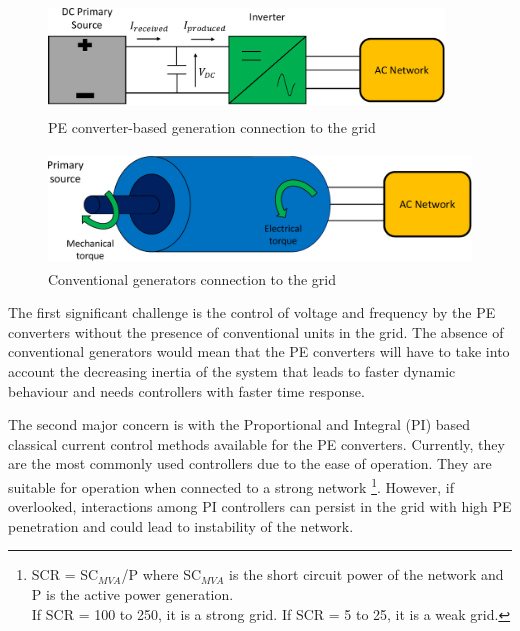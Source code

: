 \begin{figure}[H]
\centering
    \includegraphics[height = 3cm,width = 10.5cm]{Diagrams/Chapter_1/Energy_conv_system_2.pdf}
    \caption{PE converter-based generation connection to the grid \cite{denis_migrate_2018}}
    \label{fig:Energy_conv_system_2}
\end{figure}
\vspace{0mm}
\begin{figure}[H]
\centering
    \includegraphics[height = 3cm,width = 11.5cm]{Diagrams/Chapter_1/Energy_conv_system.pdf}
    \caption{Conventional generators connection to the grid \cite{denis_migrate_2018}}
    \label{fig:Energy_conv_system}
\end{figure}

The first significant challenge is the control of voltage and frequency by the \gls{PE} converters without the presence of conventional units in the grid. The absence of conventional generators would mean that the \gls{PE} converters will have to take into account the decreasing inertia of the system that leads to faster dynamic behaviour and needs controllers with faster time response. 

The second major concern is with the Proportional and Integral (\gls{PI}) based classical current control methods available for the \gls{PE} converters. Currently, they are the most commonly used controllers due to the ease of operation. They are suitable for operation when connected to a strong network \footnote{SCR = SC$_{MVA}$/P where SC$_{MVA}$ is the short circuit power of the network and P is the active power generation. \\
If SCR = 100 to 250, it is a strong grid. If SCR = 5 to 25, it is a weak grid.}. However, if overlooked, interactions among \gls{PI} controllers can persist in the grid with high \gls{PE} penetration and could lead to instability of the network.

